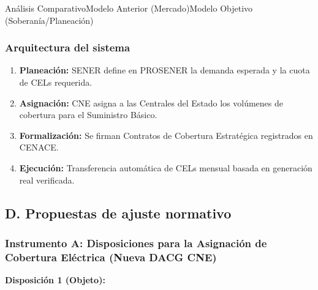\documentclass{cel}
\begin{document}
\vspace{0.3cm}
\begin{tablaParadigmaV2}{Análisis Comparativo}{Modelo Anterior (Mercado)}{Modelo Objetivo (Soberanía/Planeación)}
\end{tablaParadigmaV2}

\subsubsection{Arquitectura del sistema}
\nopagebreak

\begin{enumerate}
\item \textbf{Planeación:} SENER define en PROSENER la demanda esperada y la cuota de CELs requerida.
\item \textbf{Asignación:} CNE asigna a las Centrales del Estado los volúmenes de cobertura para el Suministro Básico.
\item \textbf{Formalización:} Se firman \textquotedbl{}Contratos de Cobertura Estratégica\textquotedbl{} registrados en CENACE.
\item \textbf{Ejecución:} Transferencia automática de CELs mensual basada en generación real verificada.

\end{enumerate}
\subsection{D. Propuestas de ajuste normativo}
\nopagebreak

\subsubsection{Instrumento A: Disposiciones para la Asignación de Cobertura Eléctrica (Nueva DACG CNE)}
\nopagebreak

\textbf{Disposición 1 (Objeto):}
\end{document}
